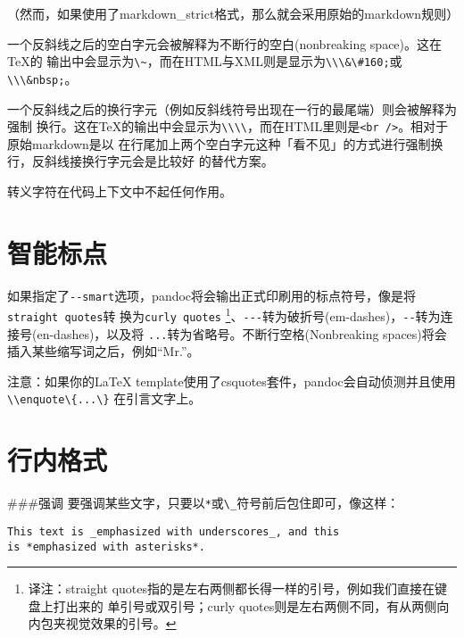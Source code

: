 \documentclass[fancyhdr,bookmark]{ctexbook}
\newcommand{\passthrough}[1]{#1}
\begin{document}
（然而，如果使用了markdown\_strict格式，那么就会采用原始的markdown规则）

一个反斜线之后的空白字元会被解释为不断行的空白(nonbreaking
space)。这在TeX的
输出中会显示为\passthrough{\lstinline!\~!}，而在HTML与XML则是显示为\passthrough{\lstinline!\\\&\#160;!}或\passthrough{\lstinline!\\\&nbsp;!}。

一个反斜线之后的换行字元（例如反斜线符号出现在一行的最尾端）则会被解释为强制
换行。这在TeX的输出中会显示为\passthrough{\lstinline!\\\\!}，而在HTML里则是\passthrough{\lstinline!<br />!}。相对于原始markdown是以
在行尾加上两个空白字元这种「看不见」的方式进行强制换行，反斜线接换行字元会是比较好
的替代方案。

转义字符在代码上下文中不起任何作用。

\hypertarget{ux667aux80fdux6807ux70b9}{%
\section{智能标点}\label{ux667aux80fdux6807ux70b9}}

如果指定了\passthrough{\lstinline!--smart!}选项，pandoc将会输出正式印刷用的标点符号，像是将\passthrough{\lstinline!straight quotes!}转
换为\passthrough{\lstinline!curly quotes!} \footnote{译注：straight
  quotes指的是左右两侧都长得一样的引号，例如我们直接在键盘上打出来的
  单引号或双引号；curly
  quotes则是左右两侧不同，有从两侧向内包夹视觉效果的引号。}、\passthrough{\lstinline!---!}转为破折号(em-dashes)，\passthrough{\lstinline!--!}转为连接号(en-dashes)，以及将
\passthrough{\lstinline!...!}转为省略号。不断行空格(Nonbreaking
spaces)将会插入某些缩写词之后，例如``Mr.''。

注意：如果你的LaTeX
template使用了csquotes套件，pandoc会自动侦测并且使用\passthrough{\lstinline!\\enquote\{...\}!}
在引言文字上。

\hypertarget{ux884cux5185ux683cux5f0f}{%
\section{行内格式}\label{ux884cux5185ux683cux5f0f}}

\#\#\#强调
要强调某些文字，只要以\passthrough{\lstinline!*!}或\passthrough{\lstinline!\_!}符号前后包住即可，像这样：

\begin{lstlisting}
This text is _emphasized with underscores_, and this
is *emphasized with asterisks*.
\end{lstlisting}
\end{document}
